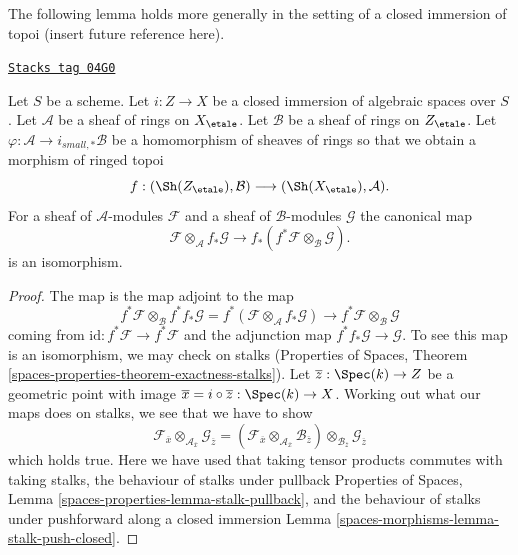 The following lemma holds more generally in the setting of a closed
immersion of topoi (insert future reference here).

\begin{lemma}
\label{spaces-morphisms-lemma-closed-immersion-rings}
\href{https://stacks.math.columbia.edu/tag/04G0}{\texttt{Stacks tag 04G0}}

Let $S$ be a scheme. Let $i : Z \to X$ be a closed immersion of algebraic
spaces over $S$. Let $\mathcal{A}$ be a sheaf of rings on $X_\etale$.
Let $\mathcal{B}$ be a sheaf of rings on $Z_\etale$.
Let $\varphi : \mathcal{A} \to i_{small, *}\mathcal{B}$
be a homomorphism of sheaves of rings so that we obtain a
morphism of ringed topoi
$$
f : (\Sh(Z_\etale), \mathcal{B}) \longrightarrow (\Sh(X_\etale), \mathcal{A}).
$$
For a sheaf of $\mathcal{A}$-modules $\mathcal{F}$ and a
sheaf of $\mathcal{B}$-modules $\mathcal{G}$ the canonical map
$$
\mathcal{F} \otimes_\mathcal{A} f_*\mathcal{G}
\longrightarrow
f_*(f^*\mathcal{F} \otimes_\mathcal{B} \mathcal{G}).
$$
is an isomorphism.
\end{lemma}

\begin{proof}
The map is the map adjoint to the map
$$
f^*\mathcal{F} \otimes_\mathcal{B}
f^* f_*\mathcal{G} =
f^*(\mathcal{F} \otimes_\mathcal{A} f_*\mathcal{G})
\longrightarrow
f^*\mathcal{F} \otimes_\mathcal{B} \mathcal{G}
$$
coming from $\text{id} : f^*\mathcal{F} \to f^*\mathcal{F}$
and the adjunction map $f^* f_*\mathcal{G} \to \mathcal{G}$.
To see this map is an isomorphism, we may check on stalks
(Properties of Spaces, Theorem
\ref{spaces-properties-theorem-exactness-stalks}).
Let $\overline{z} : \Spec(k) \to Z$ be a geometric point with
image $\overline{x} = i \circ \overline{z} : \Spec(k) \to X$.
Working out what our maps does on stalks, we see that we
have to show
$$
\mathcal{F}_{\overline{x}}
\otimes_{\mathcal{A}_{\overline{x}}}
\mathcal{G}_{\overline{z}} =
(\mathcal{F}_{\overline{x}}
\otimes_{\mathcal{A}_{\overline{x}}}
\mathcal{B}_{\overline{z}}) \otimes_{\mathcal{B}_{\overline{z}}}
\mathcal{G}_{\overline{z}}
$$
which holds true. Here we have used that
taking tensor products commutes with taking stalks, the
behaviour of stalks under pullback
Properties of Spaces, Lemma \ref{spaces-properties-lemma-stalk-pullback}, and
the behaviour of stalks under pushforward along a closed immersion
Lemma \ref{spaces-morphisms-lemma-stalk-push-closed}.
\end{proof}

